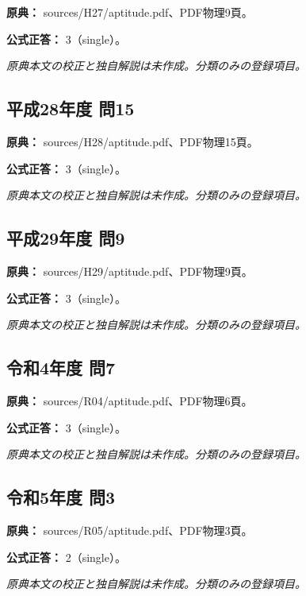 \noindent\textbf{原典：} sources/H27/aptitude.pdf、PDF物理9頁。

\textbf{公式正答：} 3（single）。

\par\textit{原典本文の校正と独自解説は未作成。分類のみの登録項目。}

\subsection{平成28年度 問15}
\label{q:h28-reg-apt-15}

\noindent\textbf{原典：} sources/H28/aptitude.pdf、PDF物理15頁。

\textbf{公式正答：} 3（single）。

\par\textit{原典本文の校正と独自解説は未作成。分類のみの登録項目。}

\subsection{平成29年度 問9}
\label{q:h29-reg-apt-09}

\noindent\textbf{原典：} sources/H29/aptitude.pdf、PDF物理9頁。

\textbf{公式正答：} 3（single）。

\par\textit{原典本文の校正と独自解説は未作成。分類のみの登録項目。}

\subsection{令和4年度 問7}
\label{q:r04-reg-apt-07}

\noindent\textbf{原典：} sources/R04/aptitude.pdf、PDF物理6頁。

\textbf{公式正答：} 3（single）。

\par\textit{原典本文の校正と独自解説は未作成。分類のみの登録項目。}

\subsection{令和5年度 問3}
\label{q:r05-reg-apt-03}

\noindent\textbf{原典：} sources/R05/aptitude.pdf、PDF物理3頁。

\textbf{公式正答：} 2（single）。

\par\textit{原典本文の校正と独自解説は未作成。分類のみの登録項目。}

